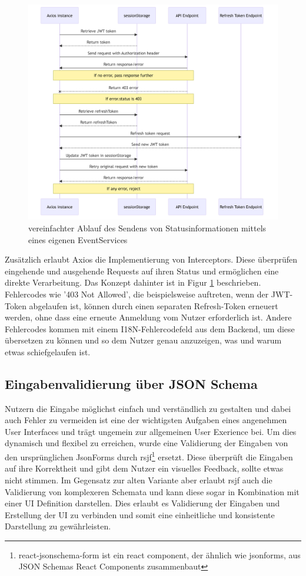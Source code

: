 \begin{figure}[h]
    \centering
    \includegraphics[width=1\linewidth]{includes/figures/axios.png}
    \caption{vereinfachter Ablauf des Sendens von Statusinformationen mittels eines eigenen EventServices}
\label{fig:react_axios}
\end{figure}

Zusätzlich erlaubt Axios die Implementierung von Interceptors. Diese überprüfen eingehende und ausgehende Requests auf ihren Status und ermöglichen eine direkte Verarbeitung. Das Konzept dahinter ist in Figur \ref{fig:react_axios} beschrieben. Fehlercodes wie '403 Not Allowed', 
die beispielsweise auftreten, wenn der JWT-Token abgelaufen ist, können durch einen separaten Refresh-Token erneuert werden, ohne dass eine erneute Anmeldung vom Nutzer erforderlich ist. Andere Fehlercodes kommen mit einem I18N-Fehlercodefeld aus dem Backend, 
um diese übersetzen zu können und so dem Nutzer genau anzuzeigen, was und warum etwas schiefgelaufen ist.


\subsection{Eingabenvalidierung über JSON Schema}
Nutzern die Eingabe möglichst einfach und verständlich zu gestalten und dabei auch Fehler zu vermeiden ist eine der wichtigsten Aufgaben eines angenehmen User Interfaces und trägt ungemein zur allgemeinen User Exerience bei.
Um dies dynamisch und flexibel zu erreichen, wurde eine Validierung der Eingaben von den ursprünglichen JsonForms durch rsjf\footnote{react-jsonschema-form ist ein react component, der ähnlich wie jsonforms, aus JSON Schemas React Components zusammenbaut} ersetzt. 
Diese überprüft die Eingaben auf ihre Korrektheit und gibt dem Nutzer ein visuelles Feedback, sollte etwas nicht stimmen. Im Gegensatz zur alten Variante aber erlaubt rsjf auch die Validierung von komplexeren Schemata und kann diese sogar in Kombination mit einer UI Definition darstellen.
Dies erlaubt es Validierung der Eingaben und Erstellung der UI zu verbinden und somit eine einheitliche und konsistente Darstellung zu gewährleisten.

